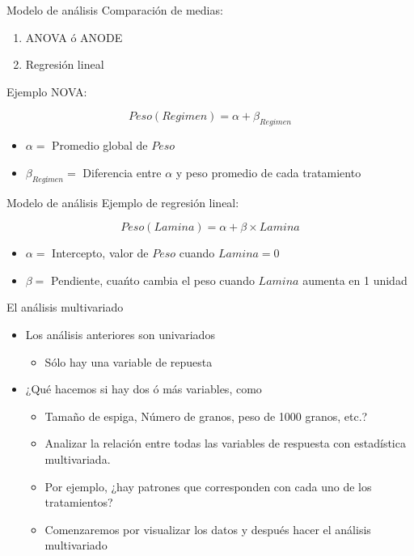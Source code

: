 \documentclass[
  11pt,
  ignorenonframetext,
]{beamer}
\providecommand{\tightlist}{%
  \setlength{\itemsep}{0pt}\setlength{\parskip}{0pt}}
\begin{document}
\begin{frame}{Modelo de análisis}
\protect\hypertarget{modelo-de-anuxe1lisis}{}
Comparación de medias:

\begin{enumerate}
\tightlist
\item
  ANOVA ó ANODE
\item
  Regresión lineal
\end{enumerate}

Ejemplo NOVA:

\[ Peso(Regimen) =  \alpha + \beta_{Regimen} \]

\begin{itemize}
\tightlist
\item
  \(\alpha =\) Promedio global de \(Peso\)
\item
  \(\beta_{Regímen} =\) Diferencia entre \(\alpha\) y peso promedio de
  cada tratamiento
\end{itemize}
\end{frame}

\begin{frame}{Modelo de análisis}
\protect\hypertarget{modelo-de-anuxe1lisis-1}{}
Ejemplo de regresión lineal:

\[ Peso(Lamina) = \alpha + \beta \times Lamina \]

\begin{itemize}
\tightlist
\item
  \(\alpha =\) Intercepto, valor de \(Peso\) cuando \(Lamina = 0\)
\item
  \(\beta =\) Pendiente, cuańto cambia el peso cuando \(Lamina\) aumenta
  en 1 unidad
\end{itemize}
\end{frame}

\begin{frame}{El análisis multivariado}
\protect\hypertarget{el-anuxe1lisis-multivariado}{}
\begin{itemize}
\item
  Los análisis anteriores son univariados

  \begin{itemize}
  \tightlist
  \item
    Sólo hay una variable de repuesta
  \end{itemize}
\item
  ¿Qué hacemos si hay dos ó más variables, como

  \begin{itemize}
  \tightlist
  \item
    Tamaño de espiga, Número de granos, peso de 1000 granos, etc.?
  \item
    Analizar la relación entre todas las variables de respuesta con
    estadística multivariada.
  \item
    Por ejemplo, ¿hay patrones que corresponden con cada uno de los
    tratamientos?
  \item
    Comenzaremos por visualizar los datos y después hacer el análisis
    multivariado
  \end{itemize}
\end{itemize}
\end{frame}
\end{document}
